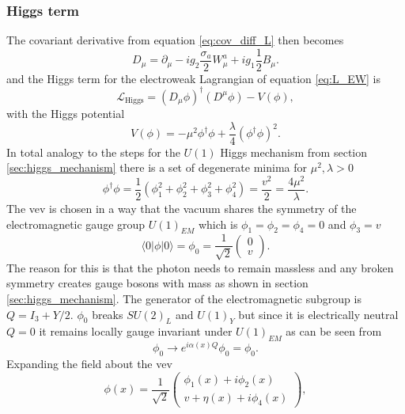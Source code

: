\subsubsection*{Higgs term}
The covariant derivative from equation \ref{eq:cov_diff_L} then becomes
\begin{equation}
    D_\mu=\partial_\mu- i g_2\frac{{\sigma}_a}{2}W_\mu^a+ ig_1\frac{1}{2}B_\mu.
\end{equation}
and the Higgs term for the electroweak Lagrangian of equation \ref{eq:L_EW} is
\begin{equation}
    \mathcal{L}_\text{Higgs}= \left(D_\mu\phi\right)^\dagger (D^\mu\phi)-V(\phi),
    \label{eq:L_higgs}
\end{equation}
with the Higgs potential
\begin{equation}
    V(\phi) = -\mu^2\phi^\dagger\phi+\frac{\lambda}{4}\left(\phi^\dagger\phi\right)^2.
    \label{eq:Higgs_V}
\end{equation}
In total analogy to the steps for the $U(1)$ Higgs mechanism from section \ref{sec:higgs_mechanism} there is a set of degenerate minima for $\mu^2,\lambda>0$
\begin{equation}
    \phi^\dagger\phi=\frac{1}{2}(\phi_1^2+\phi_2^2+\phi_3^2+\phi_4^2)=\frac{v^2}{2}=\frac{4\mu^2}{\lambda}.
    \label{eq:higgs_vev}
\end{equation}
The \ac{vev} is chosen in a way that the vacuum shares the symmetry of the electromagnetic gauge group $U(1)_{EM}$ which is \mbox{$\phi_1=\phi_2=\phi_4=0$} and $\phi_3=v$
\begin{equation}
    \langle0\vert \phi \vert0\rangle=\phi_0=\frac{1}{\sqrt{2}}
    \begin{pmatrix}
        0 \\
        v
    \end{pmatrix}.
\end{equation}
The reason for this is that the photon needs to remain massless and any broken symmetry creates gauge bosons with mass as shown in section \ref{sec:higgs_mechanism}. The generator of the electromagnetic subgroup is $Q=I_3+Y/2$. $\phi_0$ breaks $SU(2)_L$ and $U(1)_Y$ but since it is electrically neutral $Q=0$ it remains locally gauge invariant under $U(1)_{EM}$ as can be seen from
\begin{equation}
    \phi_0 \rightarrow e^{i\alpha(x)Q}\phi_0=\phi_0.
\end{equation}
Expanding the field about the \ac{vev}
\begin{equation}
    \phi(x)=\frac{1}{\sqrt{2}}
    \begin{pmatrix}
        \phi_1 (x)+i \phi_2 (x) \\
        v+ \eta(x)+i \phi_4 (x)
    \end{pmatrix},
\end{equation}
